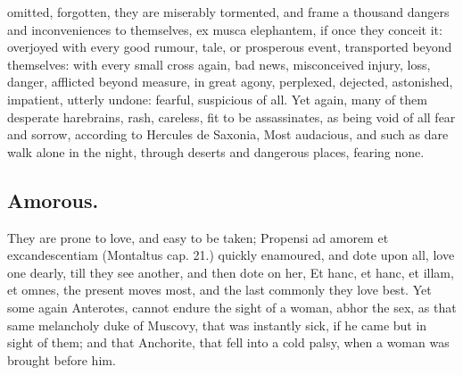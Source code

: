 {omitted, forgotten, they are miserably tormented, and frame a thousand
dangers and inconveniences to themselves, ex musca elephantem, if once
they conceit it: overjoyed with every good rumour, tale, or prosperous
event, transported beyond themselves: with every small cross again, bad
news, misconceived injury, loss, danger, afflicted beyond measure, in
great agony, perplexed, dejected, astonished, impatient, utterly
undone: fearful, suspicious of all. Yet again, many of them desperate
harebrains, rash, careless, fit to be assassinates, as being void of
all fear and sorrow, according to Hercules de Saxonia, Most
audacious, and such as dare walk alone in the night, through deserts
and dangerous places, fearing none.

\subsection{Amorous.}
They are prone to love, and easy to be taken;
Propensi ad amorem et excandescentiam (Montaltus cap. 21.) quickly
enamoured, and dote upon all, love one dearly, till they see another,
and then dote on her, Et hanc, et hanc, et illam, et omnes, the present
moves most, and the last commonly they love best. Yet some again
Anterotes, cannot endure the sight of a woman, abhor the sex, as that
same melancholy duke of Muscovy, that was instantly sick, if he
came but in sight of them; and that Anchorite, that fell into a
cold palsy, when a woman was brought before him.

}
